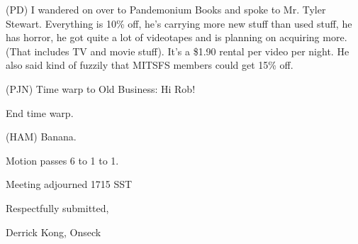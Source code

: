 (PD) I wandered on over to Pandemonium Books and spoke to Mr. Tyler
Stewart.  Everything is 10\% off, he's carrying more new stuff than
used stuff, he has horror, he got quite a lot of videotapes and is
planning on acquiring more. (That includes TV and movie stuff).  It's
a \$1.90 rental per video per night.  He also said kind of fuzzily that
MITSFS members could get 15\% off.

(PJN) Time warp to Old Business: Hi Rob!

End time warp.

(HAM) Banana.

Motion passes 6 to 1 to 1.

Meeting adjourned 1715 SST

\vspace{0.15in}
\begin{center}
Respectfully submitted,

Derrick Kong, Onseck
\end{center}

